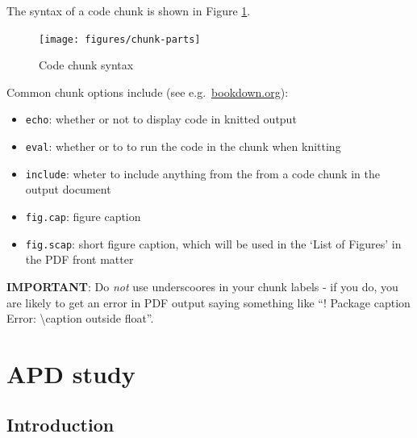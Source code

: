 \documentclass[a4paper, twoside]{templates/ociamthesis}
\providecommand{\tightlist}{%
  \setlength{\itemsep}{0pt}\setlength{\parskip}{0pt}}
\begin{document}
The syntax of a code chunk is shown in Figure \ref{fig:chunk-parts}.

\begin{figure}
\texttt{[image: figures/chunk-parts]} \caption{Code chunk syntax}\label{fig:chunk-parts}
\end{figure}

Common chunk options include (see e.g.~\href{https://bookdown.org/yihui/rmarkdown/r-code.html}{bookdown.org}):

\begin{itemize}
\tightlist
\item
  \texttt{echo}: whether or not to display code in knitted output
\item
  \texttt{eval}: whether or to to run the code in the chunk when knitting
\item
  \texttt{include}: wheter to include anything from the from a code chunk in the output document
\item
  \texttt{fig.cap}: figure caption
\item
  \texttt{fig.scap}: short figure caption, which will be used in the `List of Figures' in the PDF front matter
\end{itemize}

\textbf{IMPORTANT}: Do \emph{not} use underscoores in your chunk labels - if you do, you are likely to get an error in PDF output saying something like ``! Package caption Error: \textbackslash caption outside float''.

\hypertarget{APD-study}{%
\chapter{APD study}\label{APD-study}}


\minitoc 

\hypertarget{introduction-4}{%
\section{Introduction}\label{introduction-4}}
\end{document}
